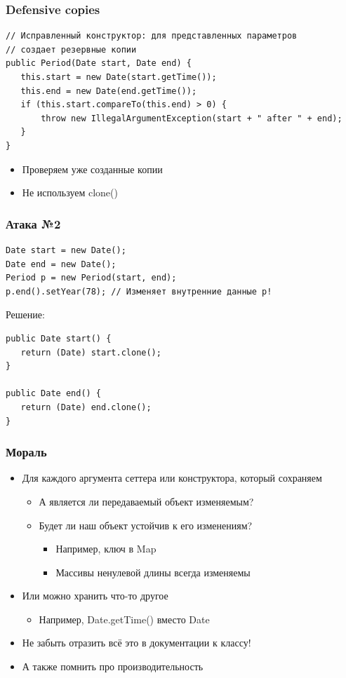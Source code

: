 \documentclass[xetex,mathserif,serif]{beamer}
\begin{document}
	\begin{frame}[fragile]
		\frametitle{Defensive copies}
		\begin{verbatim}
// Исправленный конструктор: для представленных параметров
// создает резервные копии
public Period(Date start, Date end) {
   this.start = new Date(start.getTime());
   this.end = new Date(end.getTime());
   if (this.start.compareTo(this.end) > 0) {
       throw new IllegalArgumentException(start + " after " + end);
   }
}
		\end{verbatim}
		\begin{itemize}
			\item Проверяем уже созданные копии
			\item Не используем clone()
		\end{itemize}
	\end{frame}

	\begin{frame}[fragile]
		\frametitle{Атака №2}
		\begin{verbatim}
Date start = new Date();
Date end = new Date();
Period p = new Period(start, end);
p.end().setYear(78); // Изменяет внутренние данные p!
		\end{verbatim}
		\vspace{3mm}
		\pause
		Решение:
		\begin{verbatim}
public Date start() {
   return (Date) start.clone();
}

public Date end() {
   return (Date) end.clone();
}
		\end{verbatim}
	\end{frame}

	\begin{frame}
		\frametitle{Мораль}
		\begin{itemize}
			\item Для каждого аргумента сеттера или конструктора, который сохраняем
			\begin{itemize}
				\item А является ли передаваемый объект изменяемым?
				\item Будет ли наш объект устойчив к его изменениям?
				\begin{itemize}
					\item Например, ключ в Map
					\item Массивы ненулевой длины всегда изменяемы
				\end{itemize}
			\end{itemize}
			\item Или можно хранить что-то другое
			\begin{itemize}
				\item Например, Date.getTime() вместо Date
			\end{itemize}
			\item Не забыть отразить всё это в документации к классу!
			\item А также помнить про производительность
		\end{itemize}
	\end{frame}
\end{document}
